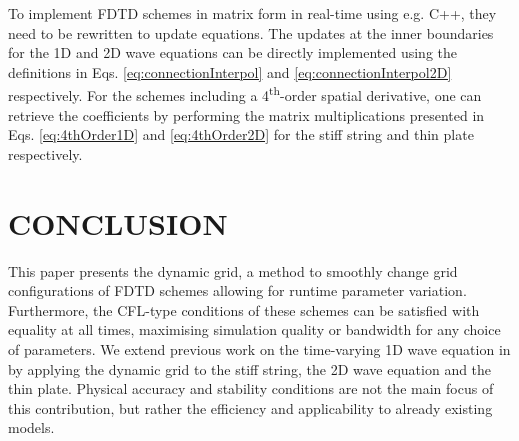 \documentclass[fleqn]{jaes}
\def\SWcomment[#1]{\textcolor{blue}{#1}}
\begin{document}



To implement FDTD schemes in matrix form in real-time using e.g. C++, they need to be rewritten to update equations. The updates at the inner boundaries for the 1D and 2D wave equations can be directly implemented using the definitions in Eqs. \eqref{eq:connectionInterpol} and \eqref{eq:connectionInterpol2D} respectively. For the schemes including a 4\textsuperscript{th}-order spatial derivative, one can retrieve the coefficients by performing the matrix multiplications presented in Eqs. \eqref{eq:4thOrder1D} and \eqref{eq:4thOrder2D} for the stiff string and thin plate respectively. 



\section{CONCLUSION}\label{sec:conclusion}
This paper presents the dynamic grid, a method to smoothly change grid configurations of FDTD schemes allowing for runtime parameter variation. Furthermore, the CFL-type conditions of these schemes can be satisfied with equality at all times, maximising simulation quality or bandwidth for any choice of parameters. We extend previous work on the time-varying 1D wave equation in \cite{Willemsen2021a} by applying the dynamic grid to the stiff string, the 2D wave equation and the thin plate. 
%
Physical accuracy and stability conditions are not the main focus of this contribution, but rather the efficiency and applicability to already existing models.
\end{document}
